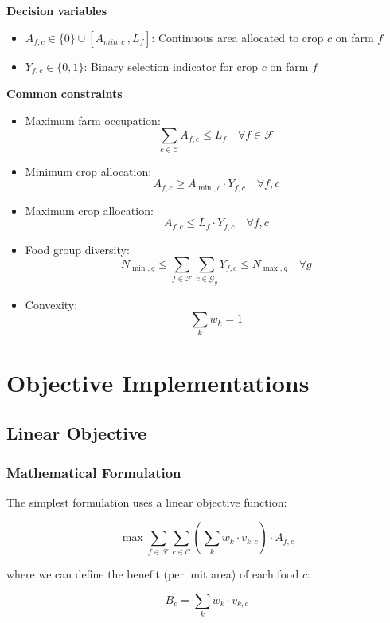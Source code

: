 \documentclass{article}
\begin{document}
\textbf{Decision variables}
\begin{itemize}
\item $A_{f,c} \in \{0\} \cup [A_{min,c}\,, L_f]$: Continuous area allocated to crop $c$ on farm $f$
    \item $Y_{f,c} \in \{0,1\}$: Binary selection indicator for crop $c$ on farm $f$
\end{itemize}

\textbf{Common constraints}
\begin{itemize}
\item Maximum farm occupation: $$\sum_{c \in \mathcal{C}} A_{f,c} \leq L_f \quad \forall f \in \mathcal{F} $$
\item  Minimum crop allocation: $$A_{f,c} \geq A_{\min,c} \cdot Y_{f,c} \quad \forall f,c\label{eq:minarea} $$
\item  Maximum crop allocation: $$A_{f,c} \leq L_f \cdot Y_{f,c} \quad \forall f,c $$
\item Food group diversity: $$N_{\min,g} \leq \sum_{f \in \mathcal{F}}\sum_{c \in \mathcal{G}_g} Y_{f,c} \leq N_{\max,g} \quad \forall g $$ 

\item Convexity: $$\sum_{k} w_k = 1$$
\end{itemize}


\section{Objective Implementations}

\subsection{Linear Objective}

\subsubsection{Mathematical Formulation}

The simplest formulation uses a linear objective function:

\begin{equation}
\max \sum_{f \in \mathcal{F}} \sum_{c \in \mathcal{C}} \left(\sum_{k} w_k \cdot v_{k,c}\right) \cdot A_{f,c}
\label{eq:linear_obj}
\end{equation}

where we can define the benefit (per unit area) of each food $c$:

\begin{equation}
   B_c = \sum_{k} w_k \cdot v_{k,c}
   \label{eq:benefit}
\end{equation}
\end{document}
